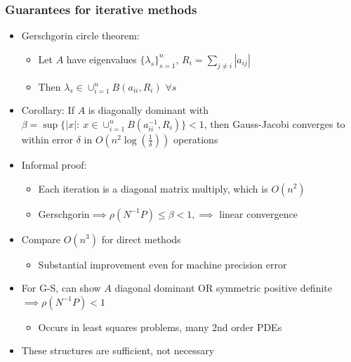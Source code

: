 \documentclass[bigger]{beamer}
\begin{document}
\begin{frame}
\frametitle{Guarantees for iterative methods}

 \begin{itemize}

\item Gerschgorin circle theorem:
\begin{itemize}
  \item Let $A$ have eigenvalues $\{\lambda_s\}_{s=1}^{n}$, $R_i=\sum_{j\neq i}\left\vert a_{ij}\right\vert$
  \item Then $\lambda_s\in \cup_{i=1}^{n} B(a_{ii},R_i)$ $\forall s$
\end{itemize}  

\item Corollary: If $A$ is diagonally dominant with $\beta=\sup\{\left\vert x \right\vert:\ x\in\cup_{i=1}^{n} B(a_{ii}^{-1},R_i)\}<1$, then Gauss-Jacobi converges to within error $\delta$ in $O(n^2\log(\frac{1}{\delta}))$ operations

\item Informal proof:
\begin{itemize}
  \item Each iteration is a diagonal matrix multiply, which is $O(n^2)$
  \item Gerschgorin$\implies\rho(N^{-1}P)\leq\beta<1,\implies$ linear convergence
\end{itemize}

\item Compare $O(n^3)$ for direct methods
\begin{itemize}
\item Substantial improvement even for machine precision error
\end{itemize}

\item For G-S, can show $A$ diagonal dominant OR symmetric positive definite $\implies\rho(N^{-1}P)<1$
\begin{itemize}
\item Occurs in least squares problems, many 2nd order PDEs
\end{itemize}

\item These structures are sufficient, not necessary


\end{itemize}

\end{frame}
\end{document}
